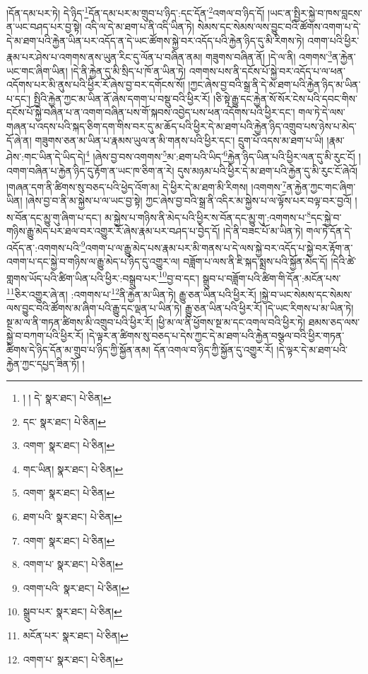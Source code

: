 །དོན་དམ་པར་ཏེ། དེ་ཉིད་\footnote{། ། དེ་  སྣར་ཐང་།  པེ་ཅིན། }དོན་དམ་པར་མ་གྲུབ་པ་ཉིད་:དང་དོན་\footnote{དང་  སྣར་ཐང་།  པེ་ཅིན། }འགལ་བ་ཉིད་དོ། །ཡང་ན་སྤྱིར་སྐྱེ་བ་ཁས་བླངས་ན་ཡང་བཤད་པར་བྱ་སྟེ། འདི་ལ་དེ་མ་ཐག་པ་ནི་འདི་ཡིན་ཏེ། སེམས་དང་སེམས་ལས་བྱུང་བའི་ཚོགས་འགག་པ་དེ་དེ་མ་ཐག་པའི་རྐྱེན་ཡིན་པར་འདོད་ན་དེ་ཡང་ཚོགས་སྐྱེ་བར་འདོད་པའི་རྐྱེན་ཉིད་དུ་མི་རིགས་ཏེ། འགག་པའི་ཕྱིར་རྣམ་པར་ཤེས་པ་འགགས་ནས་ཡུན་རིང་དུ་ལོན་པ་བཞིན་ནམ། གཟུགས་བཞིན་ནོ། །དེ་ལ་ནི། འགགས་\footnote{འགག་  སྣར་ཐང་།  པེ་ཅིན། }ན་རྐྱེན་ཡང་གང་ཞིག་ཡིན། །དེ་ནི་རྐྱེན་དུ་མི་སྲིད་པ་ཁོ་ན་ཡིན་ཏེ། འགགས་པས་ནི་དངོས་པོ་སྐྱེ་བར་འདོད་པ་ལ་ཕན་འདོགས་པར་མི་ནུས་པའི་ཕྱིར་རོ་ཞེས་བྱ་བར་དགོངས་སོ། །ཀྱང་ཞེས་བྱ་བའི་སྒྲ་ནི་དེ་མ་ཐག་པའི་རྐྱེན་ཉིད་མ་ཡིན་པ་དང་། སྤྱིའི་རྐྱེན་ཀྱང་མ་ཡིན་ནོ་ཞེས་དགག་པ་བསྡུ་བའི་ཕྱིར་རོ། །ཅི་སྟེ་རྒྱུ་དང་རྐྱེན་སོ་སོར་ངེས་པའི་དབང་གིས་དངོས་པོ་སྐྱེ་བཞིན་པ་ན་འགག་བཞིན་པས་གོ་སྐབས་འབྱེད་པས་ཕན་འདོགས་པའི་ཕྱིར་དང་། གལ་ཏེ་དེ་ལས་གཞན་པ་འདས་པའི་སྐད་ཅིག་དག་གིས་བར་དུ་མ་ཆོད་པའི་ཕྱིར་དེ་མ་ཐག་པའི་རྐྱེན་ཉིད་འགྲུབ་པས་ཉེས་པ་མེད་དོ་ཞེ་ན། གཟུགས་ཅན་མ་ཡིན་པ་རྣམས་ཡུལ་ན་མི་གནས་པའི་ཕྱིར་དང་། དྲུག་པོ་འདས་མ་ཐག་པ་ཡི། །རྣམ་ཤེས་:གང་ཡིན་དེ་ཡིད་དེ།\footnote{གང་ཡིན།  སྣར་ཐང་།  པེ་ཅིན། } །ཞེས་བྱ་བས་འགགས་\footnote{འགག་  སྣར་ཐང་།  པེ་ཅིན། }མ་:ཐག་པའི་ཡིད་\footnote{ཐག་པའི་  སྣར་ཐང་།  པེ་ཅིན། }རྐྱེན་ཉིད་ཡིན་པའི་ཕྱིར་ལན་དུ་མི་རུང་ངོ། །འགག་བཞིན་པ་རྐྱེན་ཉིད་དུ་རྟོག་ན་ཡང་ཁ་ཅིག་ན་རེ། དུས་མཉམ་པའི་ཕྱིར་དེ་མ་ཐག་པའི་རྐྱེན་དུ་མི་རུང་ངོ་ཞེའོ། །གཞན་དག་ནི་ཚིགས་སུ་བཅད་པའི་ཕྱེད་འོག་མ། དེ་ཕྱིར་དེ་མ་ཐག་མི་རིགས། །འགགས་\footnote{འགག་  སྣར་ཐང་།  པེ་ཅིན། }ན་རྐྱེན་ཀྱང་གང་ཞིག་ཡིན། །ཞེས་བྱ་བ་ནི་མ་སྐྱེས་པ་ལ་ཡང་བྱ་སྟེ། ཀྱང་ཞེས་བྱ་བའི་སྒྲ་ནི་འདིར་མ་སྐྱེས་པ་ལ་ལྟོས་པར་བལྟ་བར་བྱའོ། །ས་བོན་དང་མྱུ་གུ་ཞིག་པ་དང་། མ་སྐྱེས་པ་གཉིས་ནི་མེད་པའི་ཕྱིར་ས་བོན་དང་མྱུ་གུ་:འགགས་པ་\footnote{འགག་པ་  སྣར་ཐང་།  པེ་ཅིན། }དང་སྐྱེ་བ་གཉིས་རྒྱུ་མེད་པར་ཐལ་བར་འགྱུར་རོ་ཞེས་རྣམ་པར་བཤད་པ་བྱེད་དོ། །དེ་ནི་བཟང་པོ་མ་ཡིན་ཏེ། གལ་ཏེ་དོན་དེ་འདོད་ན་:འགགས་པའི་\footnote{འགག་པའི་  སྣར་ཐང་།  པེ་ཅིན། }འགག་པ་ལ་རྒྱུ་མེད་པས་རྣམ་པར་མི་གནས་པ་དེ་ལས་སྐྱེ་བར་འདོད་པ་སྐྱེ་བར་རྟོག་ན་འགག་པ་དང་སྐྱེ་བ་གཉིས་ལ་རྒྱུ་མེད་པ་ཉིད་དུ་འགྱུར་ལ། བཟློག་པ་ལས་ནི་ཇི་སྐད་སྨྲས་པའི་སྐྱོན་མེད་དོ། །དེའི་ཚེ་གླགས་ཡོད་པའི་ཚིག་ཡིན་པའི་ཕྱིར་:བསྒྲུབ་པར་\footnote{སྒྲུབ་པར་  སྣར་ཐང་།  པེ་ཅིན། }བྱ་བ་དང་། སྒྲུབ་པ་བཟློག་པའི་ཚིག་གི་དོན་:མངོན་པས་\footnote{མངོན་པར་  སྣར་ཐང་།  པེ་ཅིན། }ཅིར་འགྱུར་ཞེ་ན། :འགགས་པ་\footnote{འགག་པ་  སྣར་ཐང་།  པེ་ཅིན། }ནི་རྐྱེན་མ་ཡིན་ཏེ། རྒྱུ་ཅན་ཡིན་པའི་ཕྱིར་རོ། །སྐྱེ་བ་ཡང་སེམས་དང་སེམས་ལས་བྱུང་བའི་ཚོགས་མ་ཞིག་པའི་རྒྱུ་དང་ལྡན་པ་ཡིན་ཏེ། རྒྱུ་ཅན་ཡིན་པའི་ཕྱིར་རོ། །དེ་ཡང་རིགས་པ་མ་ཡིན་ཏེ། སྔ་མ་ལ་ནི་གཏན་ཚིགས་མི་འགྲུབ་པའི་ཕྱིར་རོ། །ཕྱི་མ་ལ་ནི་ཕྱོགས་སྔ་མ་དང་འགལ་བའི་ཕྱིར་ཏེ། ཐམས་ཅད་ལས་སྐྱེ་བ་བཀག་པའི་ཕྱིར་རོ། །དེ་ལྟར་ན་ཚིགས་སུ་བཅད་པ་དེས་ཀྱང་དེ་མ་ཐག་པའི་རྐྱེན་བསྩལ་བའི་ཕྱིར་གཏན་ཚིགས་དེ་ཉིད་དོན་མ་གྲུབ་པ་ཉིད་ཀྱི་སྐྱོན་ནམ། དོན་འགལ་བ་ཉིད་ཀྱི་སྐྱོན་དུ་འགྱུར་རོ། །དེ་ལྟར་དེ་མ་ཐག་པའི་རྐྱེན་ཀྱང་དཔྱད་ཟིན་ཏོ། །
